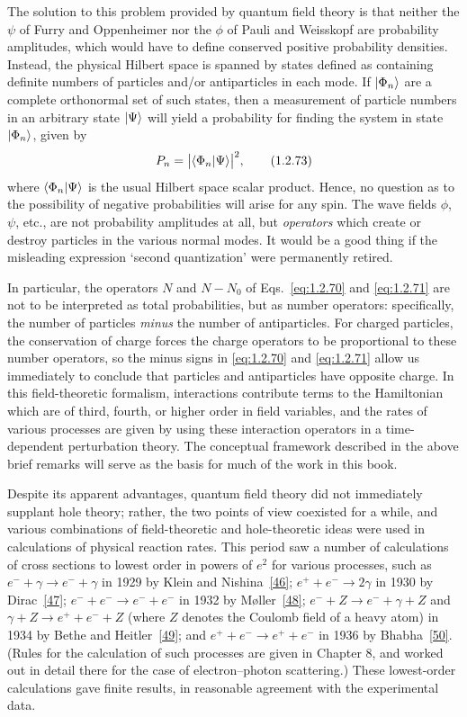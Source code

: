 The solution to this problem provided by quantum field theory is that neither
the $\psi$ of Furry and Oppenheimer nor the $\phi$ of Pauli and Weisskopf are
probability amplitudes, which would have to define conserved positive
probability densities. Instead, the physical Hilbert space is spanned by
states defined as containing definite numbers of particles and/or
antiparticles in each mode. If $\lvert \Phi_n\rangle$ are a complete orthonormal set
of such states, then a measurement of particle numbers in an arbitrary state
$\lvert \Psi\rangle$ will yield a probability for finding the system in state
$\lvert \Phi_n\rangle$, given by
\begin{equation}
  P_n=\bigl|\langle \Phi_n | \Psi\rangle\bigr|^2,
  \tag{1.2.73}\label{eq:1.2.73}
\end{equation}
where $\langle \Phi_n | \Psi\rangle$ is the usual Hilbert space scalar product.
Hence, no question as to the possibility of negative probabilities will arise
for any spin. The wave fields $\phi$, $\psi$, etc., are not probability
amplitudes at all, but \emph{operators} which create or destroy particles in
the various normal modes. It would be a good thing if the misleading
expression `second quantization' were permanently retired.

In particular, the operators $N$ and $N-N_0$ of Eqs.~\eqref{eq:1.2.70} and \eqref{eq:1.2.71}
are not to be interpreted as total probabilities, but as number operators:
specifically, the number of particles \emph{minus} the number of antiparticles.
For charged particles, the conservation of charge forces the charge operators
to be proportional to these number operators, so the minus signs in \eqref{eq:1.2.70}
and \eqref{eq:1.2.71} allow us immediately to conclude that particles and
antiparticles have opposite charge. In this field-theoretic formalism,
interactions contribute terms to the Hamiltonian which are of third, fourth,
or higher order in field variables, and the rates of various processes are
given by using these interaction operators in a time-dependent perturbation
theory. The conceptual framework described in the above brief remarks will
serve as the basis for much of the work in this book.

Despite its apparent advantages, quantum field theory did not immediately
supplant hole theory; rather, the two points of view coexisted for a while,
and various combinations of field-theoretic and hole-theoretic ideas were used
in calculations of physical reaction rates. This period saw a number of
calculations of cross sections to lowest order in powers of $e^2$ for various
processes, such as $e^-+\gamma\to e^-+\gamma$ in 1929 by Klein and
Nishina~\hyperref[ref:1.46]{[46]}; $e^++e^-\to2\gamma$ in 1930 by Dirac~\hyperref[ref:1.47]{[47]};
$e^-+e^-\to e^-+e^-$ in 1932 by M\o ller~\hyperref[ref:1.48]{[48]};
$e^-+Z\to e^-+\gamma+Z$ and $\gamma+Z\to e^++e^-+Z$ (where $Z$ denotes
the Coulomb field of a heavy atom) in 1934 by Bethe and Heitler~\hyperref[ref:1.49]{[49]}; and
$e^++e^-\to e^++e^-$ in 1936 by Bhabha~\hyperref[ref:1.50]{[50]}. (Rules for the calculation of
such processes are given in Chapter 8, and worked out in detail there for the
case of electron--photon scattering.) These lowest-order calculations gave
finite results, in reasonable agreement with the experimental data.

